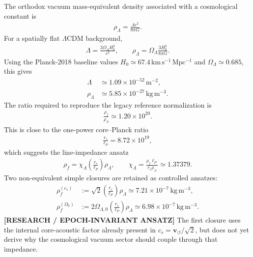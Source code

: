The orthodox vacuum mass-equivalent density associated with a cosmological
constant is
\begin{align}
    \rho_\Lambda
    =
    \frac{\Lambda c^2}{8\pi G} .
\end{align}
For a spatially flat \(\Lambda\)CDM background,
\begin{align}
    \Lambda
    =
    \frac{3\Omega_\Lambda H_0^2}{c^2},
    \qquad
    \rho_\Lambda
    =
    \Omega_\Lambda\frac{3H_0^2}{8\pi G} .
\end{align}
Using the Planck-2018 baseline values
\(H_0\simeq 67.4\,\mathrm{km\,s^{-1}\,Mpc^{-1}}\) and
\(\Omega_\Lambda\simeq0.685\), this gives
\begin{align}
    \Lambda &\simeq 1.09\times10^{-52}\,\mathrm{m^{-2}},\\
    \rho_\Lambda &\simeq 5.85\times10^{-27}\,\mathrm{kg\,m^{-3}} .
\end{align}
The ratio required to reproduce the legacy reference normalization is
\begin{align}
    \frac{\rho_{\!f}}{\rho_\Lambda}
    \simeq
    1.20\times10^{20} .
\end{align}
This is close to the one-power core--Planck ratio
\begin{align}
    \frac{r_c}{\ell_P}
    =
    8.72\times10^{19},
\end{align}
which suggests the line-impedance ansatz
\begin{align}
    \rho_{\!f}
    =
    \chi_\Lambda
    \left(\frac{r_c}{\ell_P}\right)
    \rho_\Lambda,
    \qquad
    \chi_\Lambda
    =
    \frac{\rho_{\!f}\ell_P}{r_c\rho_\Lambda}
    \simeq
    1.37379 .
    \label{eq:rt_rhof_lambda_chi}
\end{align}
Two non-equivalent simple closures are retained as controlled ansatzes:
\begin{align}
    \rho_{\!f}^{(c_s)}
    &:={}
    \sqrt{2}
    \left(\frac{r_c}{\ell_P}\right)
    \rho_\Lambda
    \simeq
    7.21\times10^{-7}\,\mathrm{kg\,m^{-3}},
    \\
    \rho_{\!f}^{(\Omega_0)}
    &:={}
    2\Omega_{\Lambda,0}
    \left(\frac{r_c}{\ell_P}\right)
    \rho_\Lambda
    \simeq
    6.98\times10^{-7}\,\mathrm{kg\,m^{-3}} .
\end{align}
\textbf{[RESEARCH / EPOCH-INVARIANT ANSATZ]} The first closure uses the
internal core-acoustic factor already present in
\(c_s=\mathbf{v}_{\!\boldsymbol{\circlearrowleft}}/\sqrt{2}\), but does not
yet derive why the cosmological vacuum sector should couple through that
impedance.

